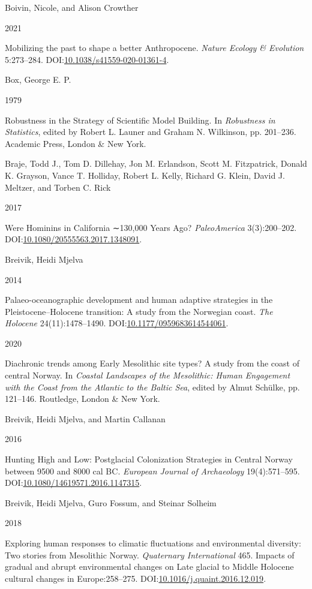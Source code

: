 \documentclass[
  12pt,
  a4paper,
  oneside]{book}
\newlength{\cslhangindent}
\newlength{\csllabelwidth}
\newlength{\cslentryspacingunit} %
\newenvironment{CSLReferences}[2] %
 {%
  \setlength{\parindent}{0pt}
  \ifodd #1
  \let\oldpar\par
  \def\par{\hangindent=\cslhangindent\oldpar}
  \fi
  \setlength{\parskip}{#2\cslentryspacingunit}
 }%
 {}
\newcommand{\CSLBlock}[1]{#1\hfill\break}
\newcommand{\CSLLeftMargin}[1]{\parbox[t]{\csllabelwidth}{#1}}
\newcommand{\CSLRightInline}[1]{\parbox[t]{\linewidth - \csllabelwidth}{#1}\break}
\begin{document}
\begin{CSLReferences}{0}{0}
\leavevmode{}%
\CSLBlock{Boivin, Nicole, and Alison Crowther}
\CSLLeftMargin{ 2021}%
\CSLRightInline{Mobilizing the past to shape a better Anthropocene. \emph{Nature Ecology \& Evolution} 5:273--284. DOI:\href{https://doi.org/10.1038/s41559-020-01361-4}{10.1038/s41559-020-01361-4}.}

\leavevmode{}%
\CSLBlock{Box, George E. P.}
\CSLLeftMargin{ 1979}%
\CSLRightInline{{Robustness in the Strategy of Scientific Model Building}. In \emph{{Robustness in Statistics}}, edited by Robert L. Launer and Graham N. Wilkinson, pp. 201--236. Academic Press, London \& New York.}

\leavevmode{}%
\CSLBlock{Braje, Todd J., Tom D. Dillehay, Jon M. Erlandson, Scott M. Fitzpatrick, Donald K. Grayson, Vance T. Holliday, Robert L. Kelly, Richard G. Klein, David J. Meltzer, and Torben C. Rick}
\CSLLeftMargin{ 2017}%
\CSLRightInline{Were Hominins in California ∼130,000 Years Ago? \emph{PaleoAmerica} 3(3):200--202. DOI:\href{https://doi.org/10.1080/20555563.2017.1348091}{10.1080/20555563.2017.1348091}.}

\leavevmode{}%
\CSLBlock{Breivik, Heidi Mjelva}
\CSLLeftMargin{ 2014}%
\CSLRightInline{Palaeo-oceanographic development and human adaptive strategies in the Pleistocene--Holocene transition: A study from the Norwegian coast. \emph{The Holocene} 24(11):1478--1490. DOI:\href{https://doi.org/10.1177/0959683614544061}{10.1177/0959683614544061}.}

\leavevmode{}%
\CSLLeftMargin{ 2020 }%
\CSLRightInline{{Diachronic trends among Early Mesolithic site types? A study from the coast of central Norway}. In \emph{{Coastal Landscapes of the Mesolithic: Human Engagement with the Coast from the Atlantic to the Baltic Sea}}, edited by Almut Schülke, pp. 121--146. Routledge, London \& New York.}

\leavevmode{}%
\CSLBlock{Breivik, Heidi Mjelva, and Martin Callanan}
\CSLLeftMargin{ 2016}%
\CSLRightInline{{Hunting High and Low: Postglacial Colonization Strategies in Central Norway between 9500 and 8000 cal BC}. \emph{European Journal of Archaeology} 19(4):571--595. DOI:\href{https://doi.org/10.1080/14619571.2016.1147315}{10.1080/14619571.2016.1147315}.}

\leavevmode{}%
\CSLBlock{Breivik, Heidi Mjelva, Guro Fossum, and Steinar Solheim}
\CSLLeftMargin{ 2018}%
\CSLRightInline{Exploring human responses to climatic fluctuations and environmental diversity: Two stories from Mesolithic Norway. \emph{Quaternary International} 465. Impacts of gradual and abrupt environmental changes on Late glacial to Middle Holocene cultural changes in Europe:258--275. DOI:\href{https://doi.org/10.1016/j.quaint.2016.12.019}{10.1016/j.quaint.2016.12.019}.}


\end{CSLReferences}
\end{document}
